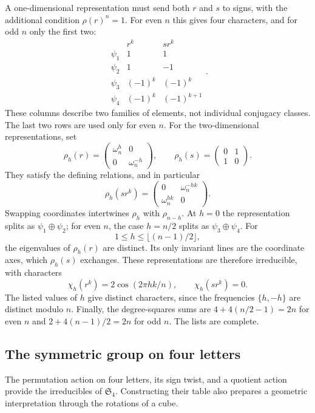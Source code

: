 A one-dimensional representation must send both $r$ and $s$ to signs,
with the additional condition $\rho(r)^n=1$. For even $n$ this gives
four characters, and for odd $n$ only the first two:
\[
 \begin{array}{c|cc}
 &r^k&sr^k\\\hline
 \psi_1&1&1\\\psi_2&1&-1\\
 \psi_3&(-1)^k&(-1)^k\\\psi_4&(-1)^k&(-1)^{k+1}
 \end{array}.
\]
These columns describe two families of elements, not individual conjugacy
classes. The last two rows are used only for even $n$.
For the two-dimensional representations, set
\[
 \rho_h(r)=\begin{pmatrix}\omega_n^h&0\\0&\omega_n^{-h}\end{pmatrix},
 \qquad \rho_h(s)=\begin{pmatrix}0&1\\1&0\end{pmatrix}.
\]
They satisfy the defining relations, and in particular
\[
 \rho_h(sr^k)=\begin{pmatrix}0&\omega_n^{-hk}\\\omega_n^{hk}&0\end{pmatrix}.
\]
Swapping coordinates intertwines $\rho_h$ with $\rho_{n-h}$.
At $h=0$ the representation splits as $\psi_1\oplus\psi_2$; for even
$n$, the case $h=n/2$ splits as $\psi_3\oplus\psi_4$.
For
\[
 1\leq h\leq\lfloor(n-1)/2\rfloor,
\]
the eigenvalues of $\rho_h(r)$ are distinct. Its only invariant lines
are the coordinate axes, which $\rho_h(s)$ exchanges. These representations
are therefore irreducible, with characters
\[
 \chi_h(r^k)=2\cos(2\pi hk/n),\qquad \chi_h(sr^k)=0.
\]
The listed values of $h$ give distinct characters, since the frequencies
$\{h,-h\}$ are distinct modulo $n$. Finally, the degree-squares sums are
$4+4(n/2-1)=2n$ for even $n$ and $2+4(n-1)/2=2n$ for odd $n$.
The lists are complete.

\subsection{The symmetric group on four letters}
\label{sect2-group-s4}

The permutation action on four letters, its sign twist, and a quotient
action provide the irreducibles of $\mathfrak S_4$. Constructing their table
also prepares a geometric interpretation through the rotations of a cube.

